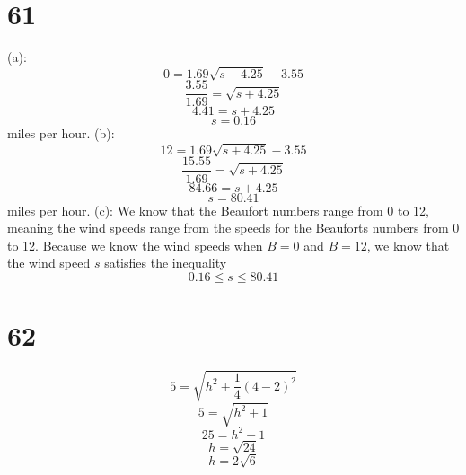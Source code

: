 \documentclass{article}
\theoremstyle{definition}
\begin{document}
\section*{61}
(a): \[ 0=1.69\sqrt{s+4.25}-3.55 \] \[ \frac{3.55}{1.69}=\sqrt{s+4.25} \] \[ 4.41=s+4.25 \] \[ s=0.16 \] miles per hour.\newline
(b): \[ 12=1.69\sqrt{s+4.25}-3.55 \] \[ \frac{15.55}{1.69}=\sqrt{s+4.25} \] \[ 84.66=s+4.25 \] \[ s=80.41 \] miles per hour.\newline
(c): We know that the Beaufort numbers range from 0 to 12, meaning the wind speeds range from the speeds for the Beauforts numbers from 0 to 12. 
Because we know the wind speeds when $B=0$ and $B=12$, we know that the wind speed $s$ satisfies the inequality \[ 0.16\le s\le 80.41 \]

\section*{62}
\[ 5=\sqrt{h^2+\frac{1}{4}(4-2)^2} \] \[ 5=\sqrt{h^2+1} \] \[ 25=h^2+1 \] \[ h=\sqrt{24} \] \[ h=2\sqrt{6} \]
\end{document}
